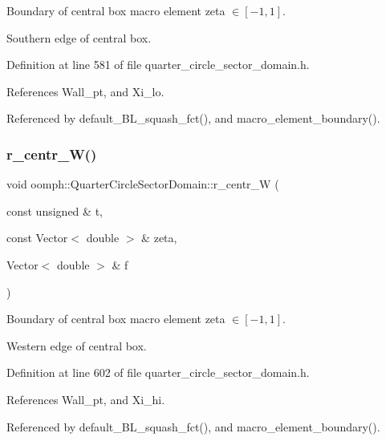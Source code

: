 Boundary of central box macro element zeta $ \in [-1,1] $. 

Southern edge of central box. 

Definition at line 581 of file quarter\+\_\+circle\+\_\+sector\+\_\+domain.\+h.



References Wall\+\_\+pt, and Xi\+\_\+lo.



Referenced by default\+\_\+\+B\+L\+\_\+squash\+\_\+fct(), and macro\+\_\+element\+\_\+boundary().

\mbox{\label{classoomph_1_1QuarterCircleSectorDomain_a453fc6f043f57031c1347065d521a1c3}} 
\subsubsection{\texorpdfstring{r\+\_\+centr\+\_\+\+W()}{r\_centr\_W()}}
{\footnotesize\ttfamily void oomph\+::\+Quarter\+Circle\+Sector\+Domain\+::r\+\_\+centr\+\_\+W (\begin{DoxyParamCaption}\item[{const unsigned \&}]{t,  }\item[{const Vector$<$ double $>$ \&}]{zeta,  }\item[{Vector$<$ double $>$ \&}]{f }\end{DoxyParamCaption})\hspace{0.3cm}{\ttfamily [private]}}



Boundary of central box macro element zeta $ \in [-1,1] $. 

Western edge of central box. 

Definition at line 602 of file quarter\+\_\+circle\+\_\+sector\+\_\+domain.\+h.



References Wall\+\_\+pt, and Xi\+\_\+hi.



Referenced by default\+\_\+\+B\+L\+\_\+squash\+\_\+fct(), and macro\+\_\+element\+\_\+boundary().

\mbox{\label{classoomph_1_1QuarterCircleSectorDomain_a951bc38c7e96a40f33c60b3ccee820bf}} 
